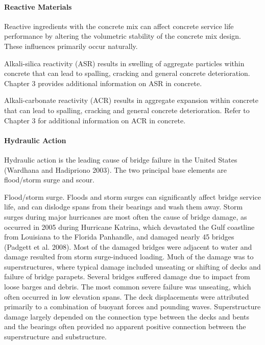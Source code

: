 \paragraph{Reactive Materials}

Reactive ingredients with the concrete mix can affect concrete service life performance by altering the
volumetric stability of the concrete mix design. These influences primarily occur naturally.

Alkali-silica reactivity (ASR) results in swelling of aggregate particles within concrete that can lead to spalling,
cracking and general concrete deterioration. Chapter 3 provides additional information on ASR in concrete.

Alkali-carbonate reactivity (ACR) results in aggregate expansion within concrete that can lead to spalling,
cracking and general concrete deterioration. Refer to Chapter 3 for additional information on ACR in concrete.

\paragraph{Hydraulic Action}

Hydraulic action is the leading cause of bridge failure in the United States (Wardhana and Hadipriono 2003).
The two principal base elements are flood/storm surge and scour.

Flood/storm surge. Floods and storm surges can significantly affect bridge service life, and can dislodge spans
from their bearings and wash them away. Storm surges during major hurricanes are most often the cause of bridge
damage, as occurred in 2005 during Hurricane Katrina, which devastated the Gulf coastline from Louisiana to the
Florida Panhandle, and damaged nearly 45 bridges (Padgett et al. 2008). Most of the damaged bridges were adjacent
to water and damage resulted from storm surge-induced loading. Much of the damage was to superstructures, where
typical damage included unseating or shifting of decks and failure of bridge parapets. Several bridges suffered
damage due to impact from loose barges and debris. The most common severe failure was unseating, which often
occurred in low elevation spans. The deck displacements were attributed primarily to a combination of buoyant
forces and pounding waves. Superstructure damage largely depended on the connection type between the decks and
bents and the bearings often provided no apparent positive connection between the superstructure and substructure.

